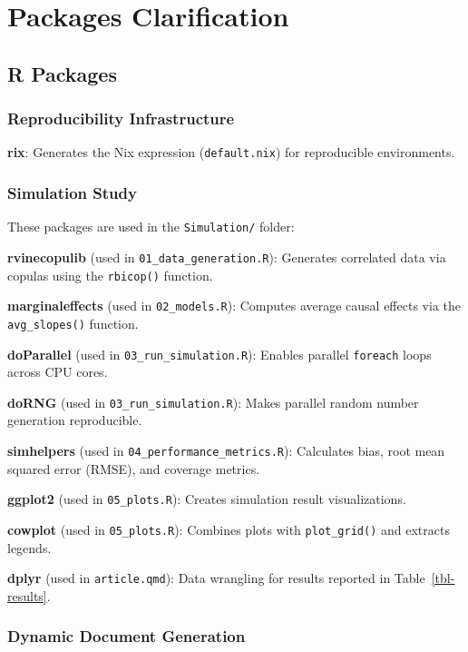 \documentclass[
  man,
  longtable,
  nolmodern,
  notxfonts,
  notimes,
  colorlinks=true,linkcolor=blue,citecolor=blue,urlcolor=blue]{apa7}
\begin{document}
\section{Packages Clarification}\label{apx-packages-clarification}

\subsection{R Packages}\label{r-packages}

\subsubsection{Reproducibility
Infrastructure}\label{reproducibility-infrastructure}

\textbf{rix}: Generates the Nix expression (\texttt{default.nix}) for
reproducible environments.

\subsubsection{Simulation Study}\label{simulation-study}

These packages are used in the \texttt{Simulation/} folder:

\textbf{rvinecopulib} (used in \texttt{01\_data\_generation.R}):
Generates correlated data via copulas using the \texttt{rbicop()}
function.

\textbf{marginaleffects} (used in \texttt{02\_models.R}): Computes
average causal effects via the \texttt{avg\_slopes()} function.

\textbf{doParallel} (used in \texttt{03\_run\_simulation.R}): Enables
parallel \texttt{foreach} loops across CPU cores.

\textbf{doRNG} (used in \texttt{03\_run\_simulation.R}): Makes parallel
random number generation reproducible.

\textbf{simhelpers} (used in \texttt{04\_performance\_metrics.R}):
Calculates bias, root mean squared error (RMSE), and coverage metrics.

\textbf{ggplot2} (used in \texttt{05\_plots.R}): Creates simulation
result visualizations.

\textbf{cowplot} (used in \texttt{05\_plots.R}): Combines plots with
\texttt{plot\_grid()} and extracts legends.

\textbf{dplyr} (used in \texttt{article.qmd}): Data wrangling for
results reported in Table~\ref{tbl-results}.

\subsubsection{Dynamic Document
Generation}\label{dynamic-document-generation}
\end{document}
